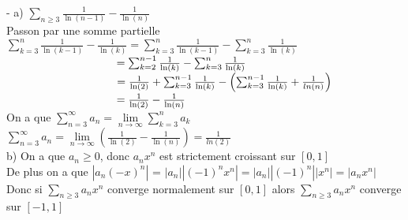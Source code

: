 \documentclass{article}
\newcommand\tab[1][1cm]{\hspace*{#1}}
\newcommand{\mysim}[2]{\underset{#1 \rightarrow #2}{\sim}}
\begin{document}
- a) $\sum_{n \geq 3} \frac{1}{\ln(n - 1)} - \frac{1}{\ln(n)}$\\
Passon par une somme partielle\\
$\sum_{k = 3}^n \frac{1}{\ln(k - 1)} - \frac{1}{\ln(k)} = \sum_{k = 3}^n \frac{1}{\ln(k - 1)} - \sum_{k = 3}^n \frac{1}{\ln(k)}$\\
$\tab[3.5cm] =  \sum_{k = 2}^{n - 1} \frac{1}{\ln(k)} -  \sum_{k = 3}^n \frac{1}{\ln(k)}$\\
$\tab[3.5cm] =  \frac{1}{\ln(2)} + \sum_{k = 3}^{n - 1} \frac{1}{\ln(k)} -  \left(\sum_{k = 3}^{n -1} \frac{1}{\ln(k)} + \frac{1}{ln(n)}\right)$\\
$\tab[3.5cm] =  \frac{1}{\ln(2)} - \frac{1}{\ln(n)}$\\
On a que $\sum_{n = 3}^\infty a_n = \underset{n \rightarrow \infty}{\lim} \sum_{k = 3}^n a_k$\\
$\sum_{n = 3}^\infty a_n = \underset{n \rightarrow \infty}{\lim} \left(\frac{1}{\ln(2)} - \frac{1}{\ln(n)}\right) = \frac{1}{ln(2)}$\\
b) On a que $a_n \geq 0$, donc $a_n x^n$ est strictement croissant sur $[0, 1]$\\
De plus on a que $|a_n (-x)^n|$ = $|a_n| |(-1)^n x^n| = |a_n| |(-1)^n| |x^n| = |a_n x^n|$\\
Donc si $\sum_{n \geq 3} a_n x^n$ converge normalement sur $[0, 1]$ alors $\sum_{n \geq 3} a_n x^n$ converge sur $[-1, 1]$\\
\end{document}
